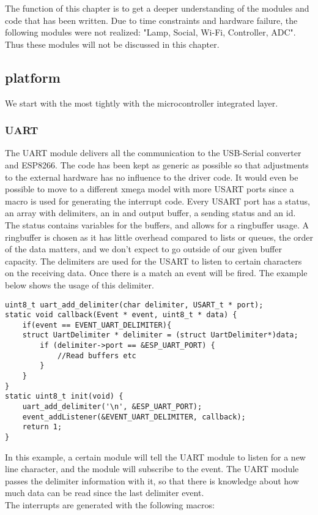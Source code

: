 The function of this chapter is to get a deeper understanding of the modules and code that has been written. Due to time constraints and hardware failure, the following modules were not realized: "Lamp, Social, Wi-Fi, Controller, ADC". Thus these modules will not be discussed in this chapter. 
\subsection{platform}
We start with the most tightly with the microcontroller integrated layer.
\subsubsection{UART}
The UART module delivers all the communication to the USB-Serial converter and ESP8266. The code has been kept as generic as possible so that adjustments to the external hardware has no influence to the driver code. It would even be possible to move to a different xmega model with more USART ports since a macro is used for generating the interrupt code. Every USART port has a status, an array with delimiters, an in and output buffer, a sending status and an id. The status contains variables for the buffers, and allows for a ringbuffer usage. A ringbuffer is chosen as it has little overhead compared to lists or queues, the order of the data matters, and we don't expect to go outside of our given buffer capacity. The delimiters are used for the USART to listen to certain characters on the receiving data. Once there is a match an event will be fired. The example below shows the usage of this delimiter.
\begin{verbatim}
uint8_t uart_add_delimiter(char delimiter, USART_t * port);
static void callback(Event * event, uint8_t * data) {
	if(event == EVENT_UART_DELIMITER){
	struct UartDelimiter * delimiter = (struct UartDelimiter*)data;
		if (delimiter->port == &ESP_UART_PORT) {
			//Read buffers etc
		}
	}
}
static uint8_t init(void) {
	uart_add_delimiter('\n', &ESP_UART_PORT);
	event_addListener(&EVENT_UART_DELIMITER, callback);
	return 1;
}
\end{verbatim}
In this example, a certain module will tell the UART module to listen for a new line character, and the module will subscribe to the event. The UART module passes the delimiter information with it, so that there is knowledge about how much data can be read since the last delimiter event.\\ 
The interrupts are generated with the following macros:
